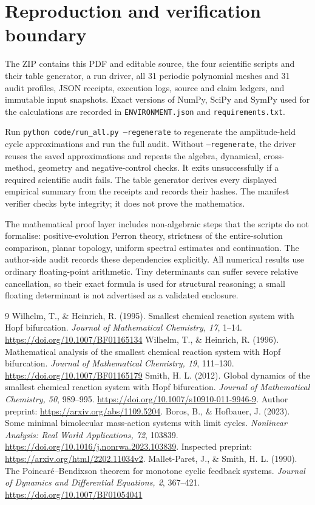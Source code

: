 \documentclass[11pt,a4paper]{article}
\numberwithin{equation}{section}
\theoremstyle{remark}\newtheorem{remark}[theorem]{Remark}
\begin{document}
\section{Reproduction and verification boundary}\label{app:reproduce}
The ZIP contains this PDF and editable source, the four scientific scripts and their table generator, a run driver, all 31 periodic polynomial meshes and 31 audit profiles, JSON receipts, execution logs, source and claim ledgers, and immutable input snapshots. Exact versions of NumPy, SciPy and SymPy used for the calculations are recorded in \texttt{ENVIRONMENT.json} and \texttt{requirements.txt}.

Run \texttt{python code/run\_all.py --regenerate} to regenerate the amplitude-held cycle approximations and run the full audit. Without \texttt{--regenerate}, the driver reuses the saved approximations and repeats the algebra, dynamical, cross-method, geometry and negative-control checks. It exits unsuccessfully if a required scientific audit fails. The table generator derives every displayed empirical summary from the receipts and records their hashes. The manifest verifier checks byte integrity; it does not prove the mathematics.

The mathematical proof layer includes non-algebraic steps that the scripts do not formalise: positive-evolution Perron theory, strictness of the entire-solution comparison, planar topology, uniform spectral estimates and continuation. The author-side audit records these dependencies explicitly. All numerical results use ordinary floating-point arithmetic. Tiny determinants can suffer severe relative cancellation, so their exact formula is used for structural reasoning; a small floating determinant is not advertised as a validated enclosure.

\begin{thebibliography}{9}
 Wilhelm, T., \& Heinrich, R. (1995). Smallest chemical reaction system with Hopf bifurcation. \emph{Journal of Mathematical Chemistry, 17}, 1--14. \url{https://doi.org/10.1007/BF01165134}
 Wilhelm, T., \& Heinrich, R. (1996). Mathematical analysis of the smallest chemical reaction system with Hopf bifurcation. \emph{Journal of Mathematical Chemistry, 19}, 111--130. \url{https://doi.org/10.1007/BF01165179}
 Smith, H. L. (2012). Global dynamics of the smallest chemical reaction system with Hopf bifurcation. \emph{Journal of Mathematical Chemistry, 50}, 989--995. \url{https://doi.org/10.1007/s10910-011-9946-9}. Author preprint: \url{https://arxiv.org/abs/1109.5204}.
 Boros, B., \& Hofbauer, J. (2023). Some minimal bimolecular mass-action systems with limit cycles. \emph{Nonlinear Analysis: Real World Applications, 72}, 103839. \url{https://doi.org/10.1016/j.nonrwa.2023.103839}. Inspected preprint: \url{https://arxiv.org/html/2202.11034v2}.
 Mallet-Paret, J., \& Smith, H. L. (1990). The Poincar\'e--Bendixson theorem for monotone cyclic feedback systems. \emph{Journal of Dynamics and Differential Equations, 2}, 367--421. \url{https://doi.org/10.1007/BF01054041}
\end{thebibliography}
\end{document}
